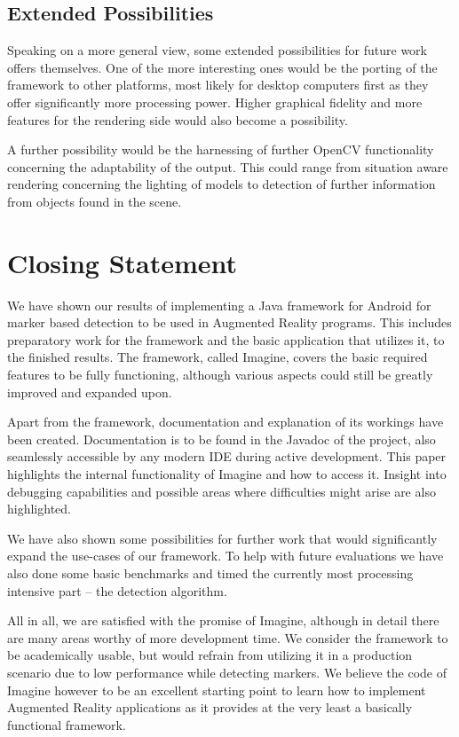 \subsection{Extended Possibilities}

Speaking on a more general view, some extended possibilities for future work offers themselves.
One of the more interesting ones would be the porting of the framework to other platforms, most likely for desktop computers first as they offer significantly more processing power.
Higher graphical fidelity and more features for the rendering side would also become a possibility.

A further possibility would be the harnessing of further OpenCV functionality concerning the adaptability of the output.
This could range from situation aware rendering concerning the lighting of models to detection of further information from objects found in the scene.

\newpage
\section{Closing Statement}

We have shown our results of implementing a Java framework for Android for marker based detection to be used in Augmented Reality programs.
This includes preparatory work for the framework and the basic application that utilizes it, to the finished results.
The framework, called Imagine, covers the basic required features to be fully functioning, although various aspects could still be greatly improved and expanded upon.

Apart from the framework, documentation and explanation of its workings have been created.
Documentation is to be found in the Javadoc of the project, also seamlessly accessible by any modern IDE during active development.
This paper highlights the internal functionality of Imagine and how to access it.
Insight into debugging capabilities and possible areas where difficulties might arise are also highlighted.

We have also shown some possibilities for further work that would significantly expand the use-cases of our framework.
To help with future evaluations we have also done some basic benchmarks and timed the currently most processing intensive part – the detection algorithm.

All in all, we are satisfied with the promise of Imagine, although in detail there are many areas worthy of more development time.
We consider the framework to be academically usable, but would refrain from utilizing it in a production scenario due to low performance while detecting markers.
We believe the code of Imagine however to be an excellent starting point to learn how to implement Augmented Reality applications as it provides at the very least a basically functional framework.
